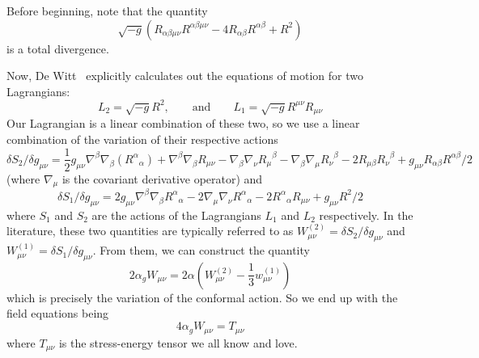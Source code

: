 
Before beginning, note that the quantity~\cite{Kazanas:1988qa}
\begin{equation}
\sqrt{-g}\left(R_{\alpha\beta\mu\nu}R^{\alpha\beta\mu\nu} -
4R_{\alpha\beta}R^{\alpha\beta} + R^{2}\right)
\end{equation}
is a total divergence.

Now, De Witt~\cite{dewitt1964} explicitly calculates out the
equations of motion for two Lagrangians:
\begin{equation}
L_{2} = \sqrt{-g}R^{2},\qquad\text{and}\qquad L_{1}=\sqrt{-g}R^{\mu\nu}R_{\mu\nu}
\end{equation}
Our Lagrangian is a linear combination of these two, so we use a
linear combination of the variation of their respective actions
\begin{equation}
\delta S_{2}/\delta g_{\mu\nu} = \frac{1}{2}
g_{\mu\nu} \nabla^{\beta}\nabla_{\beta}({R^{\alpha}}_{\alpha})  +
\nabla^{\beta}\nabla_{\beta}R_{\mu\nu}  -
\nabla_{\beta}\nabla_{\nu}{R_{\mu}}^{\beta} - \nabla_{\beta}\nabla_{\mu}{R_{\nu}}^{\beta}
-2R_{\mu\beta}{R_{\nu}}^{\beta} + g_{\mu\nu}R_{\alpha\beta}R^{\alpha\beta}/2
\end{equation}
(where $\nabla_{\mu}$ is the covariant derivative operator) and
\begin{equation}
\delta S_{1}/\delta g_{\mu\nu} =
2g_{\mu\nu}\nabla^{\beta}\nabla_{\beta}{R^{\alpha}}_{\alpha}
-2\nabla_{\mu}\nabla_{\nu}{R^{\alpha}}_{\alpha} -
2{R^{\alpha}}_{\alpha}R_{\mu\nu} + g_{\mu\nu}R^{2}/2
\end{equation}
where $S_1$ and $S_2$ are the actions of the Lagrangians $L_1$
and $L_2$ respectively. In the literature, these two quantities
are typically referred to as $W^{(2)}_{\mu\nu} = \delta
S_{2}/\delta g_{\mu\nu}$ and $W^{(1)}_{\mu\nu} = \delta
S_{1}/\delta g_{\mu\nu}$. From them, we can construct the quantity
\begin{equation}
2\alpha_{g}W_{\mu\nu} = 2\alpha(W^{(2)}_{\mu\nu} -
\frac{1}{3}w^{(1)}_{\mu\nu})
\end{equation}
which is precisely the variation of the conformal action. So we
end up with the field equations being
\begin{equation}
4\alpha_{g}W_{\mu\nu} = T_{\mu\nu}
\end{equation}
where $T_{\mu\nu}$ is the stress-energy tensor we all know and love.
